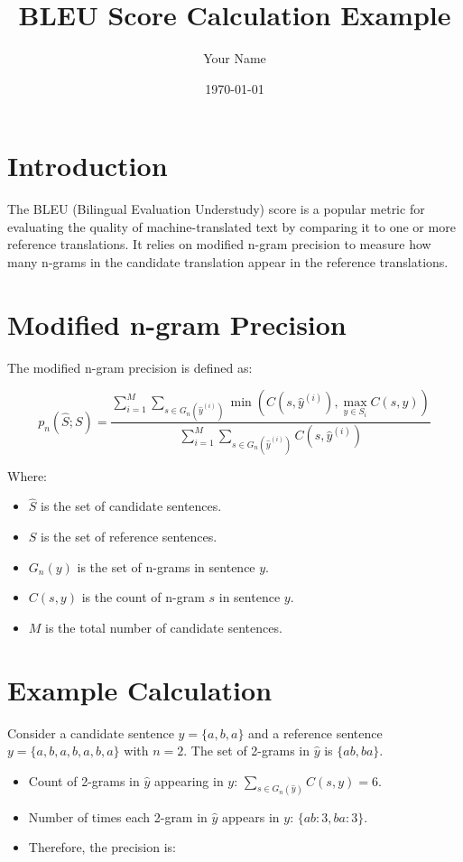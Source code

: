 \documentclass{article}
\title{BLEU Score Calculation Example}
\author{Your Name}
\date{\today}
\begin{document}
\maketitle

\section{Introduction}
The BLEU (Bilingual Evaluation Understudy) score is a popular metric for evaluating the quality of machine-translated text by comparing it to one or more reference translations. It relies on modified n-gram precision to measure how many n-grams in the candidate translation appear in the reference translations.

\section{Modified n-gram Precision}
The modified n-gram precision is defined as:

\begin{equation}
p_{n}(\hat{S}; S) = \frac{\sum_{i=1}^{M} \sum_{s \in G_{n}(\hat{y}^{(i)})} \min(C(s, \hat{y}^{(i)}), \max_{y \in S_{i}} C(s, y))}{\sum_{i=1}^{M} \sum_{s \in G_{n}(\hat{y}^{(i)})} C(s, \hat{y}^{(i)})}
\end{equation}

Where:
\begin{itemize}
    \item $\hat{S}$ is the set of candidate sentences.
    \item $S$ is the set of reference sentences.
    \item $G_{n}(y)$ is the set of n-grams in sentence $y$.
    \item $C(s, y)$ is the count of n-gram $s$ in sentence $y$.
    \item $M$ is the total number of candidate sentences.
\end{itemize}

\section{Example Calculation}
Consider a candidate sentence $\hat{y} = \{a, b, a\}$ and a reference sentence $y = \{a, b, a, b, a, b, a\}$ with $n=2$. The set of 2-grams in $\hat{y}$ is $\{ab, ba\}$.

\begin{itemize}
    \item Count of 2-grams in $\hat{y}$ appearing in $y$: $\sum_{s \in G_{n}(\hat{y})} C(s, y) = 6$.
    \item Number of times each 2-gram in $\hat{y}$ appears in $y$: $\{ab: 3, ba: 3\}$.
    \item Therefore, the precision is:
\end{itemize}
\end{document}
